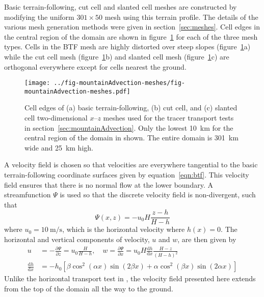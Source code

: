 Basic terrain-following, cut cell and slanted cell meshes are constructed by modifying the uniform $301 \times 50$ mesh using this terrain profile.  The details of the various mesh generation methods were given in section~\ref{sec:meshes}.  Cell edges in the central region of the domain are shown in figure~\ref{fig:mountainAdvection-meshes} for each of the three mesh types.
Cells in the BTF mesh are highly distorted over steep slopes (figure~\ref{fig:mountainAdvection-meshes}a) while the cut cell mesh (figure~\ref{fig:mountainAdvection-meshes}b) and slanted cell mesh (figure~\ref{fig:mountainAdvection-meshes}c) are orthogonal everywhere except for cells nearest the ground.

\begin{figure}
	\centering
	\texttt{[image: ../fig-mountainAdvection-meshes/fig-mountainAdvection-meshes.pdf]}
	\caption{Cell edges of (a) basic terrain-following, (b) cut cell, and (c) slanted cell two-dimensional $x$--$z$ meshes used for the tracer transport tests in section~\ref{sec:mountainAdvection}.  Only the lowest \SI{10}{\kilo\meter} for the central region of the domain in shown.  The entire domain is \SI{301}{\kilo\meter} wide and \SI{25}{\kilo\meter} high.}
	\label{fig:mountainAdvection-meshes}
\end{figure}

A velocity field is chosen so that velocities are everywhere tangential to the basic terrain-following coordinate surfaces given by equation~\eqref{eqn:btf}.  This velocity field ensures that there is no normal flow at the lower boundary.  A streamfunction $\Psi$ is used so that the discrete velocity field is non-divergent, such that
\begin{equation}
	\Psi(x,z) = -u_0 H \frac{z - h}{H - h} \label{eqn:streamfunc-btf}
\end{equation}
where $u_0 = \SI{10}{\meter\per\second}$, which is the horizontal velocity where $h(x) = 0$.
The horizontal and vertical components of velocity, $u$ and $w$, are then given by
\begin{align}
	u &= -\frac{\partial \Psi}{\partial z} = u_0 \frac{H}{H - h}, \quad w = \frac{\partial \Psi}{\partial x} = u_0 H \frac{\mathrm{d} h}{\mathrm{d} x} \frac{H - z}{\left( H - h \right)^2} \label{eqn:uw-btf} \\
	\frac{\mathrm{d} h}{\mathrm{d} x} &= - h_0 \left[ 
		\beta \cos^2 \left( \alpha x \right) \sin \left( 2 \beta x \right) +
		\alpha \cos^2 \left( \beta x \right) \sin \left( 2 \alpha x \right)
	\right]
\end{align}
Unlike the horizontal transport test in \citep{schaer2002}, the velocity field presented here extends from the top of the domain all the way to the ground.  

